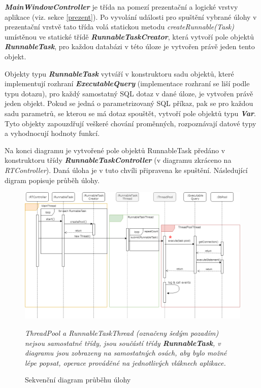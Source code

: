 \documentclass[czech,bachelor,public,dept460,male,cpdeclaration,twoside]{diploma}
\begin{document}
\textbf{\emph{MainWindowController}} je třída na pomezí prezentační a logické vrstvy aplikace (viz. sekce \ref{prezent}). Po vyvolání události pro spuštění vybrané úlohy v prezentační vrstvě tato třída volá statickou metodu \textit{createRunnable(Task)} umístěnou ve statické třídě \textbf{\emph{RunnableTaskCreator}}, která vytvoří pole objektů \textbf{\emph{RunnableTask}}, pro každou databázi v této úloze je vytvořen právě jeden tento objekt.

Objekty typu \textbf{\emph{RunnableTask}} vytváří v konstruktoru sadu objektů, které implementují rozhraní \textbf{\emph{ExecutableQuery}} (implementace rozhraní se liší podle typu dotazu), pro každý samostatný SQL dotaz v dané úloze, je vytvořen právě jeden objekt. Pokud se jedná o parametrizovaný SQL příkaz, pak se pro každou sadu parametrů, se kterou se má dotaz spouštět, vytvoří pole objektů typu \textbf{\emph{Var}}. Tyto objekty zapouzdřují veškeré chování proměnných, rozpoznávají datové typy a vyhodnocují hodnoty funkcí.

Na konci diagramu je vytvořené pole objektů RunnableTask předáno v konstruktoru třídy  \textbf{\emph{RunnableTaskController}} (v diagramu zkráceno na \textit{RTController}). Daná úloha je v tuto chvíli připravena ke spuštění. Následující digram popisuje průběh úlohy.

\begin{figure}[!htbp]\centering\includegraphics[width=1.0\textwidth]{Figures/runtask.png}\caption{Sekvenční diagram průběhu úlohy}
\label{seq2}

\textit{ThreadPool a RunnableTaskThread (označeny šedým pozadím) nejsou samostatné třídy, jsou součástí třídy \textbf{\emph{RunnableTask}}, v diagramu jsou zobrazeny na samostatných osách, aby bylo možné lépe popsat, operace prováděné na jednotlivých vláknech aplikace. }
\end{figure}
\end{document}
